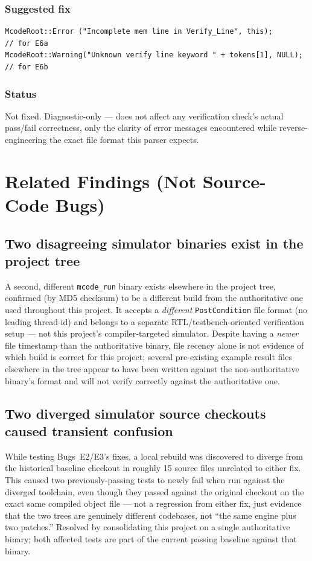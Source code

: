 \documentclass[11pt,a4paper]{report}
\begin{document}
\subsection*{Suggested fix}
\begin{lstlisting}[caption={Two one-line fixes}]
McodeRoot::Error ("Incomplete mem line in Verify_Line", this);            // for E6a
McodeRoot::Warning("Unknown verify line keyword " + tokens[1], NULL);     // for E6b
\end{lstlisting}

\subsection*{Status}
Not fixed. Diagnostic-only --- does not affect any verification check's actual pass/fail
correctness, only the clarity of error messages encountered while reverse-engineering the
exact file format this parser expects.

\chapter{Related Findings (Not Source-Code Bugs)}

\section{Two disagreeing simulator binaries exist in the project tree}
A second, different \texttt{mcode\_run} binary exists elsewhere in the project tree,
confirmed (by MD5 checksum) to be a different build from the authoritative one used
throughout this project. It accepts a \emph{different} \texttt{PostCondition} file format
(no leading thread-id) and belongs to a separate RTL/testbench-oriented verification setup
--- not this project's compiler-targeted simulator. Despite having a \emph{newer} file
timestamp than the authoritative binary, file recency alone is not evidence of which build
is correct for this project; several pre-existing example result files elsewhere in the
tree appear to have been written against the non-authoritative binary's format and will
not verify correctly against the authoritative one.

\section{Two diverged simulator source checkouts caused transient confusion}
While testing Bugs~E2/E3's fixes, a local rebuild was discovered to diverge from the
historical baseline checkout in roughly 15 source files unrelated to either fix. This
caused two previously-passing tests to newly fail when run against the diverged
toolchain, even though they passed against the original checkout on the exact same
compiled object file --- not a regression from either fix, just evidence that the two
trees are genuinely different codebases, not ``the same engine plus two patches.''
Resolved by consolidating this project on a single authoritative binary; both affected
tests are part of the current passing baseline against that binary.
\end{document}
